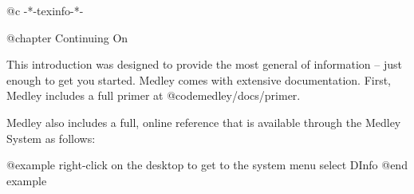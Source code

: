 @c -*-texinfo-*-

@chapter Continuing On

This introduction was designed to provide the most general of
information -- just enough to get you started.  Medley comes
with extensive documentation.  First, Medley includes a
full primer at @code{medley/docs/primer}.

Medley also includes a full, online reference that is available
through the Medley System as follows:

@example
right-click on the desktop to get to the system menu
select DInfo
@end example
